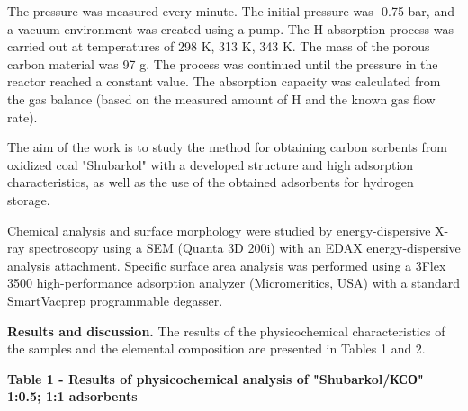 The pressure was measured every minute. The initial pressure was -0.75
bar, and a vacuum environment was created using a pump. The
H absorption process was carried out at temperatures of
298 K, 313 K, 343 K. The mass of the porous carbon material was 97 g.
The process was continued until the pressure in the reactor reached a
constant value. The absorption capacity was calculated from the gas
balance (based on the measured amount of H and the
known gas flow rate).

The aim of the work is to study the method for obtaining carbon sorbents
from oxidized coal "Shubarkol" with a developed structure and high
adsorption characteristics, as well as the use of the obtained
adsorbents for hydrogen storage.

Chemical analysis and surface morphology were studied by
energy-dispersive X-ray spectroscopy using a SEM (Quanta 3D 200i) with
an EDAX energy-dispersive analysis attachment. Specific surface area
analysis was performed using a 3Flex 3500 high-performance adsorption
analyzer (Micromeritics, USA) with a standard SmartVacprep programmable
degasser.

{\bfseries Results and discussion.} The results of the physicochemical
characteristics of the samples and the elemental composition are
presented in Tables 1 and 2.

{\bfseries Table 1 - Results of physicochemical analysis of
"Shubarkol/КСО" 1:0.5; 1:1 adsorbents}

